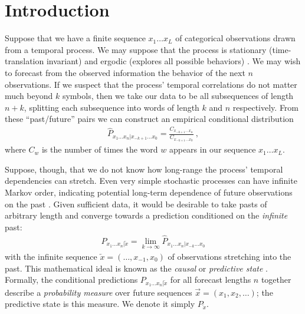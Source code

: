 \documentclass[draft,aps,pre,twocolumn,groupaddress,showkeys,nofootinbib,preprintnumbers,floatfix]{revtex4-2}
\begin{document}

\date{\today}
\maketitle

\makeatletter
\let\toc@pre\relax
\let\toc@post\relax
\makeatother


\listoffixmes

\section{Introduction}
Suppose that we have a finite sequence $x_1 \dots x_L$ of categorical
observations drawn from a temporal process. We may suppose that the process is
stationary (time-translation invariant) and ergodic (explores
all possible behaviors) \cite{Fell70a,Kall01a}. We may wish to forecast from the
observed information the behavior of the next $n$ observations. If we suspect
that the process' temporal correlations do not matter much beyond $k$ symbols,
then we take our data to be all subsequences of length $n+k$,
splitting each subsequence into words of length $k$ and $n$ respectively. From
these ``past/future'' pairs we can construct an empirical conditional
distribution
\begin{align*}
  \widehat{P}_{x_{1}\dots x_{n}|x_{-k+1}\dots x_0} = 
  \frac{C_{x_{-k+1}\dots x_{n}}}{C_{x_{-k+1}\dots x_0}}
  ~,
\end{align*}
where $C_{w}$ is the number of times the word $w$ appears in our sequence $x_1
\dots x_L$. 

Suppose, though, that we do not know how long-range the process' temporal
dependencies can stretch. Even very simple stochastic processes can have
infinite Markov order, indicating potential long-term dependence of future
observations on the past \cite{Uppe97a}. Given sufficient data, it would be
desirable to take pasts of arbitrary length and converge towards a prediction
conditioned on the \emph{infinite} past:
\begin{align}
  {P}_{x_{1}\dots x_{n}|\overleftarrow{x}}
  = \lim_{k\rightarrow\infty}
  \widehat{P}_{x_{1}\dots x_{n}|x_{-k}\dots x_0}
\label{eq:convergence}
\end{align}
with the infinite sequence $\overleftarrow{x} = (\dots,x_{-1},x_0)$ of
observations stretching into the past. This mathematical ideal is known as the
\emph{causal} or \emph{predictive state} \cite{Crut88a,Jaeg00a}. Formally, the
conditional predictions ${P}_{x_{1}\dots x_{n}|\overleftarrow{x}}$ for all
forecast lengths $n$ together describe a \emph{probability measure} over future
sequences $\overrightarrow{x} = (x_1,x_2,\dots)$; the predictive state is this
measure. We denote it simply $P_{\overleftarrow{x}}$.
\end{document}
